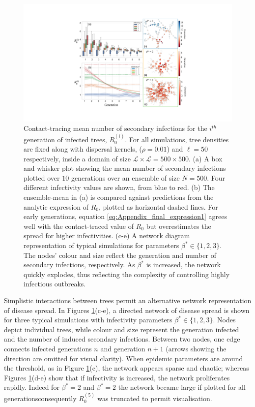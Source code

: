 \begin{figure}
    \centering
    \includegraphics[scale=0.475]{chapter5/figures/fig5-R0-contact.pdf}
    \caption{Contact-tracing mean number of secondary infections for the $i^{th}$ generation of infected trees, $R^{(i)}_0$. For all simulations, tree densities are fixed along with dispersal kernels, ($\rho=0.01$) and $\ell=50$ respectively, inside a domain of size $\mathcal{L \times L} = 500 \times 500$.
    (a) A box and whisker plot showing the mean number of secondary infections plotted over $10$ generations over an ensemble of size $N=500$. Four different infectivity values are shown, from blue to red. (b) The ensemble-mean in (a) is compared against predictions from the analytic expression of $R_0$, plotted as horizontal dashed lines. For early generations, equation \ref{eq:Appendix_final_expression1} agrees well with the contact-traced value of $R_0$ but overestimates the spread for higher infectivities. (c-e) A network diagram representation of typical simulations for parameters $\beta^* \in \lbrace 1, 2, 3 \rbrace $. The nodes' colour and size reflect the generation and number of secondary infections, respectively. As $\beta^*$ is increased, the network quickly explodes\textemdash, thus reflecting the complexity of controlling highly infectious outbreaks.}
    \label{fig:contact-trace}
\end{figure}

Simplistic interactions between trees permit an alternative network representation of disease spread.
In Figures \ref{fig:contact-trace}(c-e), a directed network of disease spread is shown for three typical simulations with infectivity parameters $\beta^* \in \lbrace 1, 2, 3 \rbrace$.
Nodes depict individual trees, while colour and size represent the generation infected and the number of induced secondary infections.
Between two nodes, one edge connects infected generations $n$  and generation $n+1$ (arrows showing the direction are omitted for visual clarity). 
When epidemic parameters are around the threshold, as in Figure \ref{fig:contact-trace}(c), the network appears sparse and chaotic;
whereas Figures \ref{fig:contact-trace}(d-e) show that if infectivity is increased, the network proliferates rapidly. 
Indeed for $\beta^*=2$ and $\beta^*=2$ the network became large if plotted for all generations\textemdash consequently $R_0^{(5)}$ was truncated to permit visualisation.

